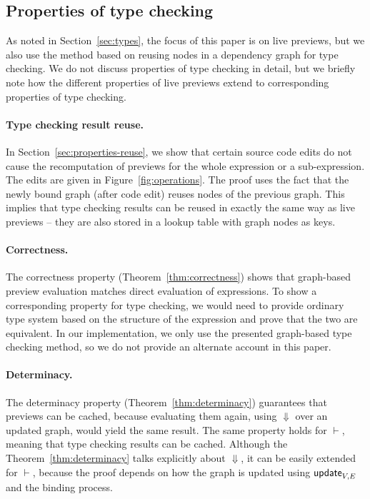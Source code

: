 \documentclass[sigplan,10pt,review,anonymous]{acmart}\settopmatter{printfolios=true,printccs=false,printacmref=false}
\theoremstyle{plain}
\theoremstyle{definition}
\newcommand{\ident}[1]{\textnormal{\sffamily #1}}
\begin{document}

\subsection{Properties of type checking}

As noted in Section~\ref{sec:types}, the focus of this paper is on live previews, but we also
use the method based on reusing nodes in a dependency graph for type checking. We do not discuss 
properties of type checking in detail, but we briefly note how the different properties of 
live previews extend to corresponding properties of type checking.

\paragraph{Type checking result reuse.} In Section~\ref{sec:properties-reuse}, we show that 
certain source code edits do not cause the recomputation of previews for the whole expression
or a sub-expression. The edits are given in Figure~\ref{fig:operations}. The proof uses the fact
that the newly bound graph (after code edit) reuses nodes of the previous graph. This implies that
type checking results can be reused in exactly the same way as live previews -- they are also 
stored in a lookup table with graph nodes as keys.

\paragraph{Correctness.} The correctness property (Theorem~\ref{thm:correctness}) shows that 
graph-based preview evaluation matches direct evaluation of expressions. To show a corresponding
property for type checking, we would need to provide ordinary type system based on the structure
of the expression and prove that the two are equivalent. In our implementation, we only use the
presented graph-based type checking method, so we do not provide an alternate account in this paper.

\paragraph{Determinacy.} The determinacy property (Theorem~\ref{thm:determinacy}) guarantees that
previews can be cached, because evaluating them again, using $\Downarrow$ over an updated graph, 
would yield the same result. The same property holds for $\vdash$, meaning that type checking 
results can be cached. Although the Theorem~\ref{thm:determinacy} talks explicitly about 
$\Downarrow$, it can be easily extended for $\vdash$, because the proof depends on how the graph
is updated using $\ident{update}_{V,E}$ and the binding process.
\end{document}

